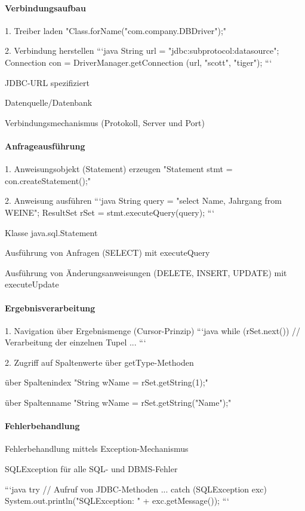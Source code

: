 \documentclass[a4paper]{article}
\begin{document}
\begin{multicols}{3}
\paragraph{Verbindungsaufbau}
1. Treiber laden "Class.forName("com.company.DBDriver");"

2. Verbindung herstellen
```java
String url = "jdbc:subprotocol:datasource";
Connection con = DriverManager.getConnection
(url, "scott", "tiger");
```

JDBC-URL spezifiziert
\begin{itemize*}
    \item Datenquelle/Datenbank
    \item Verbindungsmechanismus (Protokoll, Server und Port)
\end{itemize*}

\paragraph{Anfrageausführung}
1. Anweisungsobjekt (Statement) erzeugen "Statement stmt = con.createStatement();"

2. Anweisung ausführen
```java
String query = "select Name, Jahrgang from WEINE";
ResultSet rSet = stmt.executeQuery(query);
```

Klasse java.sql.Statement
\begin{itemize*}
    \item Ausführung von Anfragen (SELECT) mit executeQuery
    \item Ausführung von Änderungsanweisungen (DELETE, INSERT, UPDATE) mit executeUpdate
\end{itemize*}

\paragraph{Ergebnisverarbeitung}
1. Navigation über Ergebnismenge (Cursor-Prinzip)
```java
while (rSet.next()) {
        // Verarbeitung der einzelnen Tupel
        ...
    }
```

2. Zugriff auf Spaltenwerte über getType-Methoden
\begin{itemize*}
    \item über Spaltenindex "String wName = rSet.getString(1);"
    \item über Spaltenname "String wName = rSet.getString("Name");"
\end{itemize*}

\paragraph{Fehlerbehandlung}
\begin{itemize*}
    \item Fehlerbehandlung mittels Exception-Mechanismus
    \item SQLException für alle SQL- und DBMS-Fehler
\end{itemize*}
```java
try {
        // Aufruf von JDBC-Methoden
        ...
    } catch (SQLException exc) {
        System.out.println("SQLException: " +
        exc.getMessage());
    }
```


\end{multicols}
\end{document}
